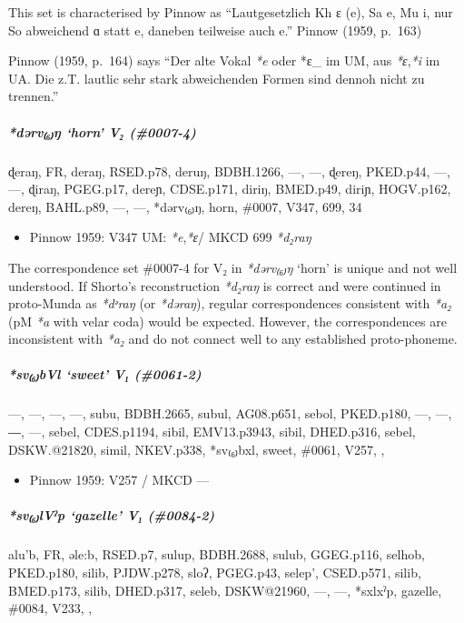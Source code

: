 \documentclass[a4paper,]{article}
\providecommand{\tightlist}{%
  \setlength{\itemsep}{0pt}\setlength{\parskip}{0pt}}
\let\oldsubparagraph\subparagraph
\renewcommand{\subparagraph}[1]{\oldsubparagraph{#1}\mbox{}}
\begin{document}
This set is characterised by Pinnow as ``Lautgesetzlich Kh ɛ (e), Sa e,
Mu i, nur So abweichend ɑ statt e, daneben teilweise auch e.'' Pinnow
(1959, p.~163)

Pinnow (1959, p.~164) says ``Der alte Vokal \emph{*e} oder *ɛ\_ im UM,
aus \emph{*ɛ},\emph{*i} im UA. Die z.T. lautlic sehr stark abweichenden
Formen sind dennoh nicht zu trennen.''

\subparagraph{\texorpdfstring{\emph{*dərv₍₆₎ŋ} `horn' V₂
(\#0007-4)}{*dərv₍₆₎ŋ horn V₂ (\#0007-4)}}\label{dux259rvux14b-horn-v-0007-4}

ɖeraŋ, FR, deraŋ, RSED.p78, deruŋ, BDBH.1266, ---, ---, ɖereŋ, PKED.p44,
---, ---, ɖiraŋ, PGEG.p17, dereɲ, CDSE.p171, diriŋ, BMED.p49, diriɲ,
HOGV.p162, dereŋ, BAHL.p89, ---, ---, *dərv₍₆₎ŋ, horn, \#0007, V347,
699, 34

\begin{itemize}
\tightlist
\item
  Pinnow 1959: V347 UM: \emph{*e},\emph{*ɛ}/ MKCD 699 \emph{*d₂raŋ}
\end{itemize}

The correspondence set \#0007-4 for V₂ in \emph{*dərv₍₆₎ŋ} `horn' is
unique and not well understood. If Shorto's reconstruction \emph{*d₂raŋ}
is correct and were continued in proto-Munda as \emph{*dᵊraŋ} (or
\emph{*dəraŋ}), regular correspondences consistent with \emph{*a₂} (pM
\emph{*a} with velar coda) would be expected. However, the
correspondences are inconsistent with \emph{*a₂} and do not connect well
to any established proto-phoneme.

\subparagraph{\texorpdfstring{\emph{*sv₍₆₎bVl} `sweet' V₁
(\#0061-2)}{*sv₍₆₎bVl sweet V₁ (\#0061-2)}}\label{svbvl-sweet-v-0061-2}

---, ---, ---, ---, subu, BDBH.2665, subul, AG08.p651, sebol, PKED.p180,
---, ---, ―, ---, sebel, CDES.p1194, sibil, EMV13.p3943, sibil,
DHED.p316, sebel, DSKW.@21820, simil, NKEV.p338, *sv₍₆₎bxl, sweet,
\#0061, V257, ,

\begin{itemize}
\tightlist
\item
  Pinnow 1959: V257 / MKCD ---
\end{itemize}

\subparagraph{\texorpdfstring{\emph{*sv₍₆₎lVˀp} `gazelle' V₁
(\#0084-2)}{*sv₍₆₎lVˀp gazelle V₁ (\#0084-2)}}\label{svlvux2c0p-gazelle-v-0084-2}

alu'b, FR, əle:b, RSED.p7, sulup, BDBH.2688, sulub, GGEG.p116, selhob,
PKED.p180, silib, PJDW.p278, sloʔ, PGEG.p43, selep', CSED.p571, silib,
BMED.p173, silib, DHED.p317, seleb, DSKW@21960, ---, ---, *sxlxˀp,
gazelle, \#0084, V233, ,
\end{document}
